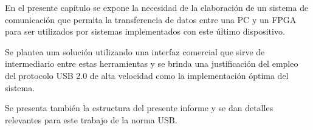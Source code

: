En el presente capítulo se expone la necesidad de la elaboración de un sistema de comunicación que permita la transferencia de datos entre una PC y un FPGA para ser utilizados por sistemas implementados con este último dispositivo.

Se plantea una solución utilizando una interfaz comercial que sirve de intermediario entre estas herramientas y se brinda una justificación del empleo del protocolo USB 2.0 de alta velocidad como la implementación óptima del sistema.

Se presenta también la estructura del presente informe y se dan detalles relevantes para este trabajo de la norma USB.